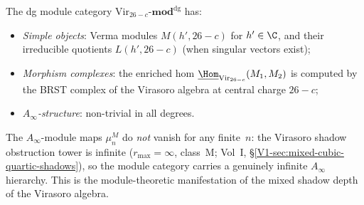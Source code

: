 \begin{proposition}
The dg module category
$\mathrm{Vir}_{26-c}\text{-}\mathbf{mod}^{\mathrm{dg}}$
has:
\begin{itemize}
\item \emph{Simple objects}: Verma modules $M(h',26-c)$
 for $h'\in\C$, and their irreducible quotients $L(h',26-c)$
 (when singular vectors exist);
\item \emph{Morphism complexes}: the enriched hom
 $\underline{\Hom}_{\mathrm{Vir}_{26-c}}(M_1,M_2)$
 is computed by the BRST complex of the Virasoro algebra
 at central charge $26-c$;
\item \emph{$A_\infty$-structure}: non-trivial in all
 degrees.
\end{itemize}
The $A_\infty$-module maps $\mu_n^M$ do \emph{not} vanish
for any finite~$n$: the Virasoro shadow obstruction tower is infinite
($r_{\max}=\infty$, class~M;
Vol~I, \S\ref*{V1-sec:mixed-cubic-quartic-shadows}), so the
module category carries a genuinely infinite $A_\infty$
hierarchy. This is the module-theoretic manifestation
of the mixed shadow depth of the Virasoro algebra.
\end{proposition}

